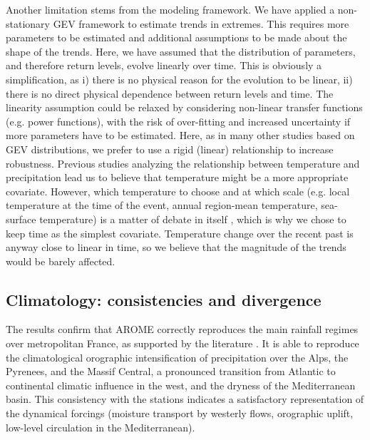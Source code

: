 ﻿\documentclass[hess, manuscript]{copernicus}
\begin{document}
Another limitation stems from the modeling framework. We have applied a non-stationary GEV framework to estimate trends in extremes. This requires more parameters to be estimated and additional assumptions to be made about the shape of the trends. Here, we have assumed that the distribution of parameters, and therefore return levels, evolve linearly over time. This is obviously a simplification, as i) there is no physical reason for the evolution to be linear, ii) there is no direct physical dependence between return levels and time. The linearity assumption could be relaxed by considering non-linear transfer functions (e.g. power functions), with the risk of over-fitting and increased uncertainty if more parameters have to be estimated. Here, as in many other studies based on GEV distributions, we prefer to use a rigid (linear) relationship to increase robustness. Previous studies analyzing the relationship between temperature and precipitation \citep{DaSilva2025} lead us to believe that temperature might be a more appropriate covariate.
However, which temperature to choose and at which scale (e.g. local temperature at the time of the event, annual region-mean temperature, sea-surface temperature)  is a matter of debate in itself \citep{Schroeer2018, Dash2023, Zeder2020}, which is why we chose to keep time as the simplest covariate. Temperature change over the recent past is anyway close to linear in time, so we believe that the magnitude of the trends would be barely affected.



\subsection{Climatology: consistencies and divergence}\label{climatology-consistencies-divergence-and-limitations}

The results confirm that AROME correctly reproduces the main rainfall
regimes over metropolitan France, as supported by the literature \citep{Fumiere2020,Caillaud2021,hess-28-2579-2024,LucasPicher2024,Cortes-Hernandez2024}. It is able to reproduce the climatological orographic intensification of precipitation over the Alps,
the Pyrenees, and the Massif Central, a pronounced transition from Atlantic to continental climatic influence in the west, and the dryness of the Mediterranean
basin. This consistency with the stations indicates a satisfactory
representation of the dynamical forcings (moisture transport by westerly
flows, orographic uplift, low-level circulation in the Mediterranean).
\end{document}
